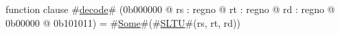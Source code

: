 function clause #\hyperref[zdecode]{decode}# (0b000000 @ rs : regno @ rt : regno @ rd : regno @ 0b00000 @ 0b101011) =
  #\hyperref[zSome]{Some}#(#\hyperref[zSLTU]{SLTU}#(rs, rt, rd))
